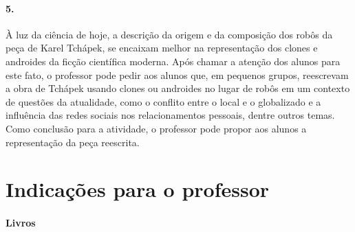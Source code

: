 \documentclass[11pt]{hedrabook}
\begin{document}
\paragraph{5.}

À luz da ciência de hoje, a descrição da origem e da composição dos robôs da
peça de Karel Tchápek, se encaixam melhor na representação dos clones e
androides da ficção científica moderna. Após chamar a atenção dos alunos para
este fato, o professor pode pedir aos alunos que, em pequenos grupos,
reescrevam a obra de Tchápek usando clones ou androides no lugar de robôs em um
contexto de questões da atualidade, como o conflito entre o local e o
globalizado e a influência das redes sociais nos relacionamentos pessoais,
dentre outros temas. Como conclusão para a atividade, o professor pode propor
aos alunos a representação da peça reescrita. 



\section{Indicações para o professor}

\bigskip

\paragraph{Livros}
\end{document}
